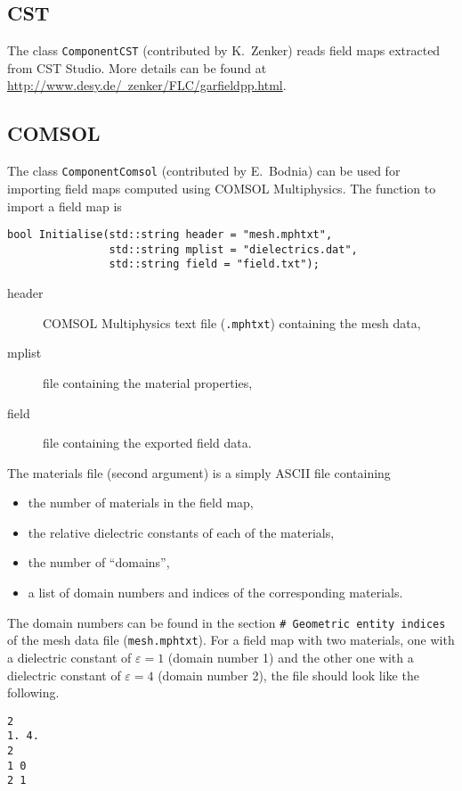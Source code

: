 \subsection{CST}

The class \texttt{ComponentCST} (contributed by K.~Zenker) reads field maps 
extracted from CST Studio. More details can be found at 
\href{http://www.desy.de/~zenker/FLC/garfieldpp.html}{http://www.desy.de/~zenker/FLC/garfieldpp.html}.

\subsection{COMSOL}

The class \texttt{ComponentComsol} (contributed by E.~Bodnia) can be used for 
importing field maps computed using COMSOL Multiphysics.
The function to import a field map is 
\begin{lstlisting}
bool Initialise(std::string header = "mesh.mphtxt",
                std::string mplist = "dielectrics.dat",
                std::string field = "field.txt");
\end{lstlisting}
\begin{description}
  \item[header] COMSOL Multiphysics text file (\texttt{.mphtxt}) containing the mesh data,
  \item[mplist] file containing the material properties, 
  \item[field] file containing the exported field data. 
\end{description}
The materials file (second argument) is a simply ASCII file containing
\begin{itemize}
  \item
  the number of materials in the field map, 
  \item
  the relative dielectric constants of each of the materials,
  \item
  the number of ``domains'',
  \item
  a list of domain numbers and indices of the corresponding materials.
\end{itemize}
The domain numbers can be found in the section 
\texttt{\# Geometric entity indices} of the mesh data file 
(\texttt{mesh.mphtxt}).
For a field map with two materials, 
one with a dielectric constant of $\varepsilon = 1$ (domain number 1) and 
the other one with a dielectric constant of $\varepsilon = 4$ 
(domain number 2), the file should look like the following.
\begin{lstlisting}
2
1. 4. 
2
1 0
2 1
\end{lstlisting}

